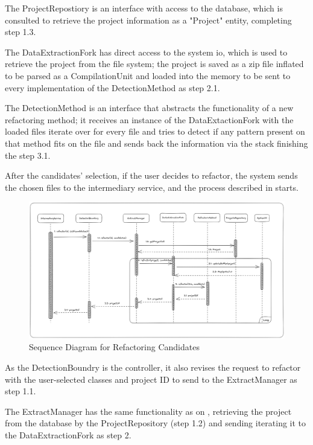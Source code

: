 The ProjectRepostiory is an interface with access to the database, which is consulted to retrieve the project information as a "Project" entity, completing step 1.3.

The DataExtractionFork has direct access to the system io, which is used to retrieve the project from the file system; the project is saved as a zip file inflated to be parsed as a CompilationUnit and loaded into the memory to be sent to every implementation of the DetectionMethod as step 2.1.

The DetectionMethod is an interface that abstracts the functionality of a new refactoring method; it receives an instance of the DataExtactionFork with the loaded files iterate over for every file and tries to detect if any pattern present on that method fits on the file and sends back the information via the stack finishing the step 3.1.

After the candidates' selection, if the user decides to refactor, the system sends the chosen files to the intermediary service, and the process described in  starts.

\begin{figure}[ht!]
\SetCaptionWidth{\textwidth}
\caption{Sequence Diagram for Refactoring Candidates}
\label{fig-refactoring}
\includegraphics[width=160mm]{Chapter-2/Figures/refactoring.png}
\end{figure}


As the DetectionBoundry is the controller, it also revises the request to refactor with the user-selected classes and project ID to send to the ExtractManager as step 1.1.

The ExtractManager has the same functionality as on , retrieving the project from the database by the ProjectRepository (step 1.2) and sending iterating it to the DataExtractionFork as step 2.

